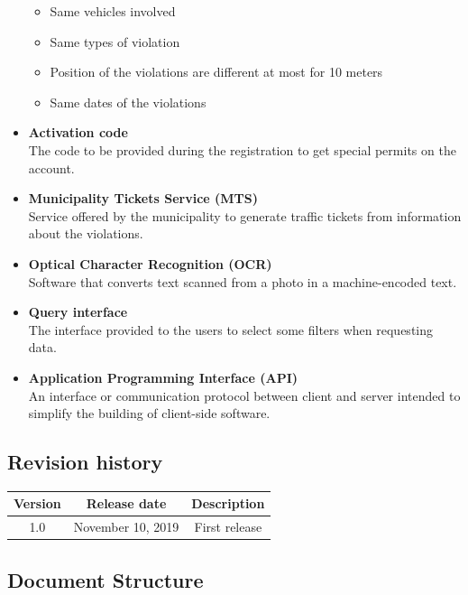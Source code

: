 \documentclass[a4paper]{article}
\begin{document}
\begin{itemize}
  \begin{itemize}
  \item
    Same vehicles involved
  \item
    Same types of violation
  \item
    Position of the violations are different at most for 10 meters
  \item
    Same dates of the violations
  \end{itemize}
\item
  \textbf{Activation code}\\
  The code to be provided during the registration to get special permits
  on the account.
\item
  \textbf{Municipality Tickets Service (MTS)}\\
  Service offered by the municipality to generate traffic tickets from
  information about the violations.
\item
  \textbf{Optical Character Recognition (OCR)}\\
  Software that converts text scanned from a photo in a machine-encoded
  text.
\item
  \textbf{Query interface}\\
  The interface provided to the users to select some filters when
  requesting data.
\item
  \textbf{Application Programming Interface (API)}\\
  An interface or communication protocol between client and server
  intended to simplify the building of client-side software.
\end{itemize}

\subsection{Revision history}

\begin{table}[H]
\centering
\begin{tabular}{|c|c|c|}
\hline
Version & Release date & Description\tabularnewline
\hline
1.0 & November 10, 2019 & First release\tabularnewline
\hline
\end{tabular}
\end{table}

\subsection{Document Structure}
\end{document}
